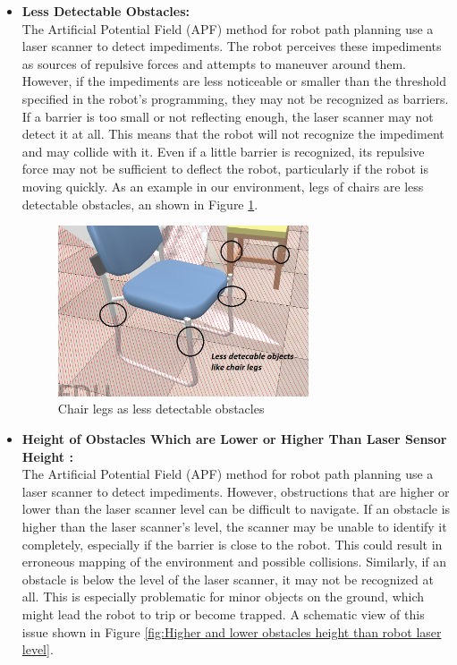 \begin{itemize}
       
       \item  \textbf{ Less Detectable Obstacles: }\\
       The Artificial Potential Field (APF) method for robot path planning use a laser scanner to detect impediments. The robot perceives these impediments as sources of repulsive forces and attempts to maneuver around them. However, if the impediments are less noticeable or smaller than the threshold specified in the robot's programming, they may not be recognized as barriers. If a barrier is too small or not reflecting enough, the laser scanner may not detect it at all. This means that the robot will not recognize the impediment and may collide with it. Even if a little barrier is recognized, its repulsive force may not be sufficient to deflect the robot, particularly if the robot is moving quickly. As an example in our environment, legs of chairs are less detectable obstacles, an shown in Figure \ref{fig:Chair legs as less detectable obstacles}.   
\begin{figure}[H]
  \centering
  \includegraphics[width= 0.7\textwidth]{Figures/Chair legs.PNG}
  \caption[Chair legs as less detectable obstacles]{Chair legs as less detectable obstacles}
   \label{fig:Chair legs as less detectable obstacles}
\end{figure}

       \item  \textbf{ Height of Obstacles Which are Lower or Higher Than Laser Sensor Height : }\\
       The Artificial Potential Field (APF) method for robot path planning use a laser scanner to detect impediments. However, obstructions that are higher or lower than the laser scanner level can be difficult to navigate. If an obstacle is higher than the laser scanner's level, the scanner may be unable to identify it completely, especially if the barrier is close to the robot. This could result in erroneous mapping of the environment and possible collisions. Similarly, if an obstacle is below the level of the laser scanner, it may not be recognized at all. This is especially problematic for minor objects on the ground, which might lead the robot to trip or become trapped. A schematic view of this issue shown in Figure 
       \ref{fig:Higher and lower obstacles height than robot laser level}. 


\end{itemize}
